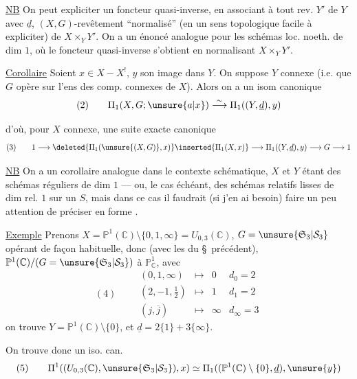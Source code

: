 \uline{NB} On peut expliciter un foncteur quasi-inverse, en associant à tout rev.  $Y'$ de $Y$  avec $\underline d$,   $(X,G)$-revêtement ``normalisé'' (en un sens topologique facile à expliciter) de $X\times_Y Y'$. On a un énoncé analogue pour les schémas loc. noeth.  de dim $1$, où le foncteur quasi-inverse s'obtient en normalisant $X\times_Y Y'$.

\uline{Corollaire} Soient $x\in X-X^{!}$, $y$ son image dans $Y$. On suppose $Y$ connexe (i.e. que $G$ opère  sur l'ens des comp. connexes de $X$). Alors on a un isom canonique
\[
(2)\qquad \Pi_1(X,G;\unsure{a|x})\overset{\sim}{\longrightarrow}\Pi_1((Y,\underline d),y)
\]


d'où, pour $X$ connexe, une suite exacte canonique
\[
(3)\qquad
1\longrightarrow
\deleted{\Pi_1(\unsure{(X,G)},x)}\inserted{\Pi_1(X,x)}
\longrightarrow\Pi_1((Y,\underline d),y)\longrightarrow G\longrightarrow 1
\]

\uline{NB} On a  un corollaire analogue dans le contexte schématique, $X$ et $Y$ étant des schémas réguliers de dim $1$ --- ou, le cas échéant, des schémas relatifs lisses de dim rel. $1$ sur un $S$, mais dans ce cas il faudrait (si j'en ai besoin) faire un peu attention de préciser  en forme .

\uline{Exemple} Prenons $X=\mathbb P^1(\mathbb C)\setminus\{0,1,\infty\}=U_{0,3}(\mathbb C)$,
$G=\unsure{\mathfrak S_3|\mathcal S_3}$ opérant de façon habituelle, donc (avec les   du \S\ précédent),
 $\mathbb P^1(\mathbb C)/(G=\unsure{\mathfrak S_3|\mathcal S_3})$ à $\mathbb P^1_{\mathbb C}$, avec
\[
(4)\qquad
\begin{array}{rcll}
(0,1,\infty)&\longmapsto&0&d_0=2\\
(2,-1,\tfrac12)&\longmapsto&1&d_1=2\\
(j,\overline j)&\longmapsto&\infty&d_\infty=3
\end{array}
\]
on trouve $Y=\mathbb P^1(\mathbb C)\setminus\{0\}$, et $\underline d=2\{1\}+3\{\infty\}$.

On trouve donc un iso. can.
\[
(5)\qquad
\Pi^{1}((U_{0,3}(\mathbb C),\unsure{\mathfrak S_3|\mathcal S_3}),x)
\simeq\Pi_1((\mathbb P^1(\mathbb C)\setminus\{0\},\underline d),\unsure{y})
\]

